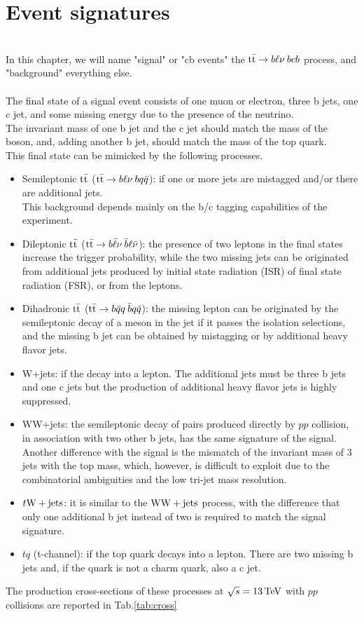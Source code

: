 \section{Event signatures}
\\
In this chapter, we will name "signal" or "cb events" the ${{\text{t}}{\bar{\text{t}}}} \to b\ell\nu\: bcb$ process, and "background" everything else.\\
\\
The final state of a signal event consists of one muon or electron, three b jets, one c jet, and some missing energy due to the presence of the neutrino.\\
The invariant mass of one b jet and the c jet should match the mass of the \PW boson, and, adding another b jet, should match the mass of the top quark.\\
This final state can be mimicked by the following processes.
\begin{itemize}
    \item Semileptonic ${{\text{t}}{\bar{\text{t}}}}$ (${{\text{t}}{\bar{\text{t}}}}\to b\ell\nu \: bq\bar{q}$): if one or more jets are mistagged and/or there are additional jets.\\
    This background depends mainly on the b/c tagging capabilities of the experiment.
    \item Dileptonic ${{\text{t}}{\bar{\text{t}}}}$ (${{\text{t}}{\bar{\text{t}}}} \to b\bar{\ell}\nu \: \bar{b}\ell\bar{\nu}$): the presence of two leptons in the final states increase the trigger probability, while the two missing jets can be originated from additional jets produced by initial state radiation (ISR) of final state radiation (FSR), or from the leptons.
    \item Dihadronic ${{\text{t}}{\bar{\text{t}}}}$ (${{\text{t}}{\bar{\text{t}}}} \to b\bar{q}q \: \bar{b}q\bar{q}$): the missing lepton can be originated by the semileptonic decay of a meson in the jet if it passes the isolation selections, and the missing b jet can be obtained by mistagging or by additional heavy flavor jets.
    \item W+jets: if the \PW decay into a lepton. The additional jets must be three b jets and one c jets but the production of additional heavy flavor jets is highly suppressed.
    \item WW+jets: the semileptonic decay of \PW pairs produced directly by $pp$ collision, in association with two other b jets, has the same signature of the signal. Another difference with the signal is the mismatch of the invariant mass of 3 jets with the top mass, which, however, is difficult to exploit due to the combinatorial ambiguities and the low tri-jet mass resolution.  
    \item $t{\text{W}}+\text{jets}$: it is similar to the ${\text{W}} {\text{W}} + \text{jets}$ process, with the difference that only one additional b jet instead of two is required to match the signal signature.
    \item $tq$ (t-channel): if the top quark decays into a lepton. There are two missing b jets and, if the quark is not a charm quark, also a c jet.
\end{itemize}
The production cross-sections of these processes  at $\sqrt{s}=13{\,\text{Te\hspace{-.08em}V}}$ with $pp$ collisions are reported in Tab.\ref{tab:cross}

